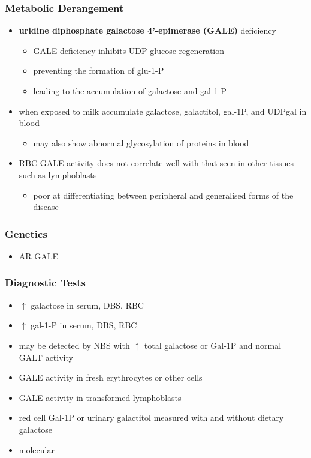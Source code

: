 \documentclass{scrartcl}
\begin{document}
\subsubsection{Metabolic Derangement}
\label{sec:org5310467}
\begin{itemize}
\item \textbf{uridine diphosphate galactose 4’-epimerase (GALE)} deficiency
\begin{itemize}
\item GALE deficiency inhibits UDP-glucose regeneration
\item preventing the formation of glu-1-P
\item leading to the accumulation of galactose and gal-1-P
\end{itemize}
\item when exposed to milk accumulate galactose, galactitol, gal-1P, and
UDPgal in blood
\begin{itemize}
\item may also show abnormal glycosylation of proteins in blood
\end{itemize}
\item RBC GALE activity does not correlate well with that seen in
other tissues such as lymphoblasts
\begin{itemize}
\item poor at differentiating between peripheral and generalised forms
of the disease
\end{itemize}
\end{itemize}

\subsubsection{Genetics}
\label{sec:orgdf1a192}
\begin{itemize}
\item AR GALE
\end{itemize}

\subsubsection{Diagnostic Tests}
\label{sec:org731b5b9}
\begin{itemize}
\item \(\uparrow\) galactose in serum, DBS, RBC
\item \(\uparrow\) gal-1-P in serum, DBS, RBC
\item may be detected by NBS with \(\uparrow\) total galactose or Gal-1P and normal GALT activity
\item GALE activity in fresh erythrocytes or other cells
\item GALE activity in transformed lymphoblasts
\item red cell Gal-1P or urinary galactitol measured with and without dietary galactose
\item molecular
\end{itemize}
\end{document}
